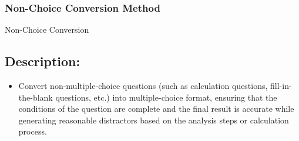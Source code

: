 \subsubsection{Non-Choice Conversion Method}
\begin{methodbox}{Non-Choice Conversion}
\subsection*{Description:}
\begin{itemize}
    \item Convert non-multiple-choice questions (such as calculation questions, fill-in-the-blank questions, etc.) into multiple-choice format, ensuring that the conditions of the question are complete and the final result is accurate while generating reasonable distractors based on the analysis steps or calculation process.
\end{itemize}

\end{methodbox}
